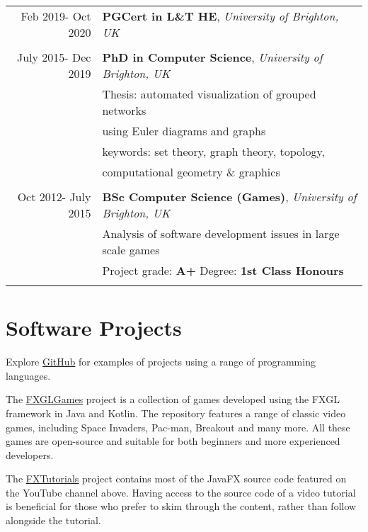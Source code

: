 \documentclass[a4paper,11pt]{article} %
\begin{document}
\begin{tabular}{r|p{11cm}}

Feb 2019- Oct 2020 & \textbf{PGCert in L\&T HE}, \emph{University of Brighton, UK}\\
\multicolumn{2}{c}{} \\


July 2015- Dec 2019 & \textbf{PhD in Computer Science}, \emph{University of Brighton, UK}\\
& Thesis: automated visualization of grouped networks\\
& using Euler diagrams and graphs\\
& keywords: set theory, graph theory, topology,\\
& computational geometry \& graphics \\
\multicolumn{2}{c}{} \\

	
Oct 2012- July 2015 & \textbf{BSc Computer Science (Games)}, \emph{University of Brighton, UK}\\
& Analysis of software development issues in large scale games\\
&\normalsize Project grade: \textbf{A+} Degree: \textbf{1st Class Honours} \\
\multicolumn{2}{c}{} \\

\end{tabular}





\section{Software Projects}

Explore \href{https://github.com/AlmasB}{GitHub} for examples of projects using a range of programming languages.

The \href{https://github.com/AlmasB/FXGLGames}{FXGLGames} project is a collection of games developed using the FXGL framework in Java and Kotlin. The repository features a range of classic video games, including Space Invaders, Pac-man, Breakout and many more. All these games are open-source and suitable for both beginners and more experienced developers.

The \href{https://github.com/AlmasB/FXTutorials}{FXTutorials} project contains most of the JavaFX source code featured on the YouTube channel above. Having access to the source code of a video tutorial is beneficial for those who prefer to skim through the content, rather than follow alongside the tutorial.
\end{document}
